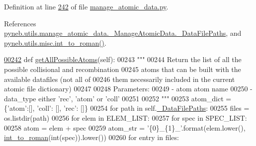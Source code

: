 Definition at line \hyperlink{manage__atomic__data_8py_source_l00242}{242} of file \hyperlink{manage__atomic__data_8py_source}{manage\+\_\+atomic\+\_\+data.\+py}.



References \hyperlink{manage__atomic__data_8py_source_l00104}{pyneb.\+utils.\+manage\+\_\+atomic\+\_\+data.\+\_\+\+Manage\+Atomic\+Data.\+\_\+\+Data\+File\+Paths}, and \hyperlink{misc_8py_source_l00013}{pyneb.\+utils.\+misc.\+int\+\_\+to\+\_\+roman()}.


\begin{DoxyCode}
\hypertarget{classpyneb_1_1utils_1_1manage__atomic__data_1_1___manage_atomic_data_l00242}{}\hyperlink{classpyneb_1_1utils_1_1manage__atomic__data_1_1___manage_atomic_data_a5de7925aac194c157f7fbd243ee25c17}{00242}     \textcolor{keyword}{def }\hyperlink{classpyneb_1_1utils_1_1manage__atomic__data_1_1___manage_atomic_data_a5de7925aac194c157f7fbd243ee25c17}{getAllPossibleAtoms}(self):
00243         \textcolor{stringliteral}{"""}
00244 \textcolor{stringliteral}{        Return the list of all the possible collisional and recombination }
00245 \textcolor{stringliteral}{        atoms that can be built with the available datafiles (not all of }
00246 \textcolor{stringliteral}{        them necessarily included in the current atomic file dictionary) }
00247 \textcolor{stringliteral}{                    }
00248 \textcolor{stringliteral}{        Parameters:}
00249 \textcolor{stringliteral}{           - atom        atom name}
00250 \textcolor{stringliteral}{           - data\_type   either 'rec', 'atom' or 'coll'}
00251 \textcolor{stringliteral}{}
00252 \textcolor{stringliteral}{        """}
00253         atom\_dict = \{\textcolor{stringliteral}{'atom'}:[], \textcolor{stringliteral}{'coll'}: [], \textcolor{stringliteral}{'rec'}: []\}
00254         \textcolor{keywordflow}{for} path \textcolor{keywordflow}{in} self.\hyperlink{classpyneb_1_1utils_1_1manage__atomic__data_1_1___manage_atomic_data_a92da10ed6b2395c54f88300c05a71ae9}{\_DataFilePaths}:
00255             files = os.listdir(path)
00256             \textcolor{keywordflow}{for} elem \textcolor{keywordflow}{in} ELEM\_LIST:
00257                 \textcolor{keywordflow}{for} spec \textcolor{keywordflow}{in} SPEC\_LIST:
00258                     atom = elem + spec
00259                     atom\_str = \textcolor{stringliteral}{'\{0\}\_\{1\}\_'}.format(elem.lower(), \hyperlink{namespacepyneb_1_1utils_1_1misc_aec4e973d4cb9299f749ef190ea636a06}{int\_to\_roman}(int(spec)).lower())
00260                     \textcolor{keywordflow}{for} entry \textcolor{keywordflow}{in} files:

\end{DoxyCode}
